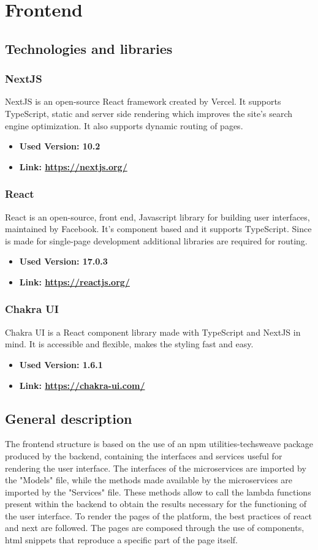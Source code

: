 \section{Frontend}
\subsection{Technologies and libraries}
\subsubsection{NextJS}
NextJS is an open-source React framework created by Vercel. It supports TypeScript, static and server side rendering which improves the site's search engine optimization. It also supports dynamic routing of pages.
\begin{itemize}
  \item \textbf{Used Version: 10.2}
  \item \textbf{Link: \url{https://nextjs.org/}}
\end{itemize}
\subsubsection{React}
React is an open-source, front end, Javascript library for building user interfaces, maintained by Facebook. It's component based and it supports TypeScript. Since is made for single-page development additional libraries are required for routing.
\begin{itemize}
  \item \textbf{Used Version: 17.0.3}
  \item \textbf{Link: \url{https://reactjs.org/}}
\end{itemize}
\subsubsection{Chakra UI}
Chakra UI is a React component library made with TypeScript and NextJS in mind. It is accessible and flexible, makes the styling fast and easy.
\begin{itemize}
  \item \textbf{Used Version: 1.6.1}
  \item \textbf{Link: \url{https://chakra-ui.com/}}
\end{itemize}
\subsection{General description}
The frontend structure is based on the use of an npm utilities-techsweave package produced by the backend, containing the interfaces and services useful for rendering the user interface. The interfaces of the microservices are imported by the "Models" file, while the methods made available by the microservices are imported by the "Services" file. These methods allow to call the lambda functions present within the backend to obtain the results necessary for the functioning of the user interface. To render the pages of the platform, the best practices of react and next are followed. The pages are composed through the use of components, html snippets that reproduce a specific part of the page itself.
